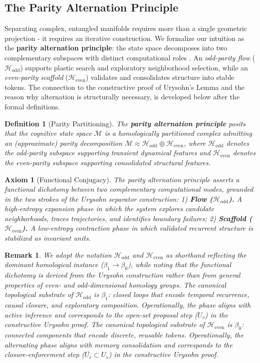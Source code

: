 \documentclass{article}
\newcommand{\Heven}{\mathcal{H}_{\text{even}}}
\newcommand{\Hodd}{\mathcal{H}_{\text{odd}}}
\newtheorem{definition}{Definition}
\newtheorem{remark}{Remark}
\newtheorem{axiom}{Axiom}
\begin{document}
 
\subsection{The Parity Alternation Principle}
 
Separating complex, entangled manifolds requires more than a single geometric projection - it requires an iterative construction. We formalize our intuition as the \textbf{parity alternation principle}: the state space decomposes into two complementary subspaces with distinct computational roles \cite{mcclelland_why_1995}. An \emph{odd-parity flow} ($\Hodd$) supports plastic search and exploratory neighborhood selection, while an \emph{even-parity scaffold} ($\Heven$) validates and consolidates structure into stable tokens. The connection to the constructive proof of Urysohn's Lemma \cite{urysohn_zum_1925} and the reason why alternation is structurally necessary, is developed below after the formal definitions.
 
\begin{definition}[Parity Partitioning]
The \textbf{parity alternation principle} posits that the cognitive state space $\mathcal{M}$ is a \emph{homologically partitioned complex} admitting an (approximate) parity decomposition
$\mathcal{M} \approx \Hodd \oplus \Heven$,
where $\Hodd$ denotes the odd-parity subspace supporting transient dynamical features and $\Heven$ denotes the even-parity subspace supporting consolidated structural features.
\end{definition}
 
\begin{axiom}[Functional Conjugacy]
The parity alternation principle asserts a functional dichotomy between two complementary computational modes, grounded in the two strokes of the Urysohn separator construction:
1) \textbf{Flow ($\Hodd$).} A high-entropy \emph{expansion} phase in which the system explores candidate neighborhoods, traces trajectories, and identifies boundary failures;
2) \textbf{Scaffold ($\Heven$).} A low-entropy \emph{contraction} phase in which validated recurrent structure is stabilized as invariant units.
\end{axiom}

\begin{remark}
We adopt the notation $\Hodd$ and $\Heven$ as shorthand reflecting the dominant homological instance ($\beta_1 \to \beta_0$), while noting that the functional dichotomy is derived from the Urysohn construction rather than from general properties of even- and odd-dimensional homology groups.
The canonical topological substrate of $\Hodd$ is $\beta_1$: closed loops that encode temporal recurrence, causal closure, and exploratory composition. Operationally, the phase aligns with \emph{active inference} \cite{friston2017active} and corresponds to the open-set proposal step ($U_r$) in the constructive Urysohn proof.  The canonical topological substrate of $\Heven$ is $\beta_0$: connected components that encode discrete, reusable tokens. Operationally, the alternating phase aligns with \emph{memory consolidation} \cite{squire2015memory} and corresponds to the closure-enforcement step ($\overline{U_r} \subset U_s$) in the constructive Urysohn proof.
\end{remark}
 
\end{document}
